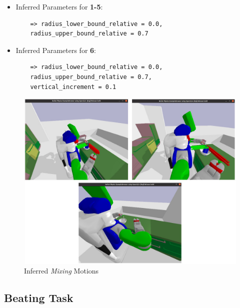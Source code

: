 \begin{itemize}
  \item Inferred Parameters for \textbf{1-5}: 
   \begin{lstlisting}
    => radius_lower_bound_relative = 0.0, 
    radius_upper_bound_relative = 0.7
  \end{lstlisting}
  \item Inferred Parameters for \textbf{6}:
  \begin{lstlisting}
    => radius_lower_bound_relative = 0.0, 
    radius_upper_bound_relative = 0.7,
    vertical_increment = 0.1
  \end{lstlisting}
\end{itemize}

\begin{figure}[H]
  \includegraphics[scale=0.35]{Graphics/mixing_evaluation.jpg}
  \caption{Inferred \textit{Mixing} Motions}
  \label{fig:mixingverb WikiHow}
\end{figure}

\subsection*{Beating Task}

